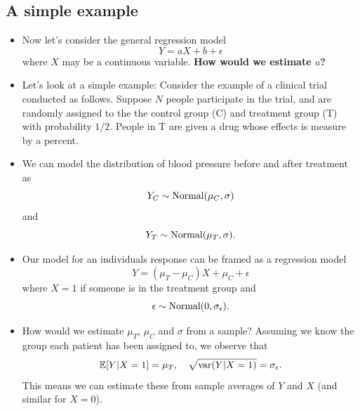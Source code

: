  






\subsection{A simple example}
\begin{itemize}
\item Now let's consider the general regression model
\begin{equation}
Y = aX + b + \epsilon 
\end{equation}
where $X$ may be a continuous variable. 
{\bf How would we estimate $a$? }
\item Let's look at a simple example: 
Consider the example of a clinical trial conducted as follows. Suppose $N$ people participate in the trial, and are randomly assigned to the the control group (C) and treatment group (T) with probability $1/2$. People in T are given a drug whose effects is measure by a percent.  
\item We can model the distribution of blood pressure before and after treatment as 
\begin{equation}
Y_C \sim {\rm Normal}(\mu_C,\sigma)
\end{equation}
and 
\begin{equation}
Y_T \sim {\rm Normal}(\mu_T,\sigma).
\end{equation}
\item Our model for an individuals response can be framed as a regression model 
\begin{equation}\label{eq:clinical}
Y  = (\mu_T-\mu_C)X + \mu_C + \epsilon
\end{equation}
where $X=1$ if someone is in the treatment group and 
\begin{equation}
\epsilon \sim {\rm Normal}(0,\sigma_{\epsilon}). 
\end{equation}
\item How would we estimate $\mu_T$, $\mu_C$ and $\sigma$ from a sample? Assuming we know the group each patient has been assigned to, we observe that 
\begin{equation}
\mathbb E[Y|X=1] = \mu_T,\quad  \sqrt{{\rm var}(Y|X=1)} = \sigma_{\epsilon}. 
\end{equation}
This means we can estimate these from sample averages of $Y$ and $X$ (and similar for $X=0$).

\end{itemize}
